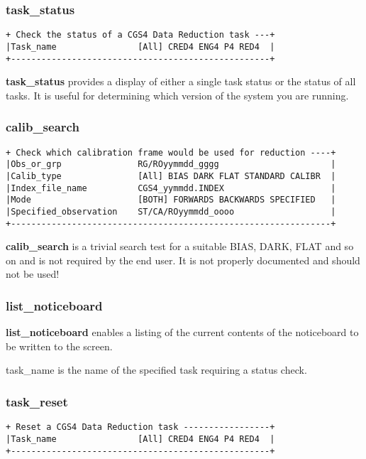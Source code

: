 {\subsubsection{task\_status}
\begin{verbatim}
+ Check the status of a CGS4 Data Reduction task ---+
|Task_name                [All] CRED4 ENG4 P4 RED4  |
+---------------------------------------------------+
\end{verbatim}

{\bf task\_status} provides a display of either a single task status or the
status of all tasks. It is useful for determining which version of the 
system you are running.

\subsubsection{calib\_search}
\begin{verbatim}
+ Check which calibration frame would be used for reduction ----+
|Obs_or_grp               RG/ROyymmdd_gggg                      |
|Calib_type               [All] BIAS DARK FLAT STANDARD CALIBR  |
|Index_file_name          CGS4_yymmdd.INDEX                     |
|Mode                     [BOTH] FORWARDS BACKWARDS SPECIFIED   |
|Specified_observation    ST/CA/ROyymmdd_oooo                   |
+---------------------------------------------------------------+
\end{verbatim}

{\bf calib\_search} is a trivial search test for a suitable {\sf BIAS}, 
{\sf DARK}, {\sf FLAT} and so on and is not required by the end user. 
It is not properly documented and should not be used!

\subsubsection{list\_noticeboard}

{\bf list\_noticeboard} enables a listing of the current contents of the
noticeboard to be written to the screen.

{\sf task\_name} is the name of the specified task requiring a status check.

\subsubsection{task\_reset}
\begin{verbatim}
+ Reset a CGS4 Data Reduction task -----------------+
|Task_name                [All] CRED4 ENG4 P4 RED4  |
+---------------------------------------------------+
\end{verbatim}

}
